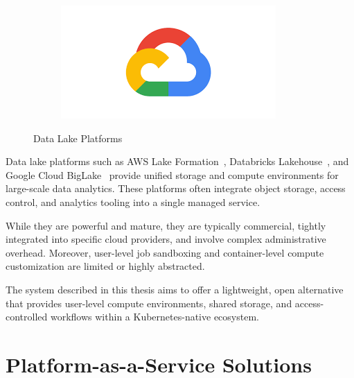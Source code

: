 \begin{figure}[h!]
\begin{subfigure}[b]{0.1\textwidth}
    \label{fig:databricks}
  \end{subfigure}
  \hfill
  \begin{subfigure}[b]{0.3\textwidth}
    \includegraphics[width=\textwidth]{Images/google-cloud.png}
    \label{fig:google}
  \end{subfigure}
  \caption{Data Lake Platforms}
  \label{fig:authservices}
\end{figure}

Data lake platforms such as AWS Lake Formation~\cite{aws-lake-formation}, Databricks Lakehouse~\cite{lakehouse}, 
and Google Cloud BigLake~\cite{biglake} provide unified storage and compute environments for large-scale data 
analytics. These platforms often integrate object storage, access control, and analytics tooling into a single 
managed service.

While they are powerful and mature, they are typically commercial, tightly integrated into specific cloud providers, and involve 
complex administrative overhead. Moreover, user-level job sandboxing and container-level compute customization are limited or 
highly abstracted.

The system described in this thesis aims to offer a lightweight, open alternative that provides user-level compute environments, 
shared storage, and access-controlled workflows within a Kubernetes-native ecosystem.

\section{Platform-as-a-Service Solutions}

